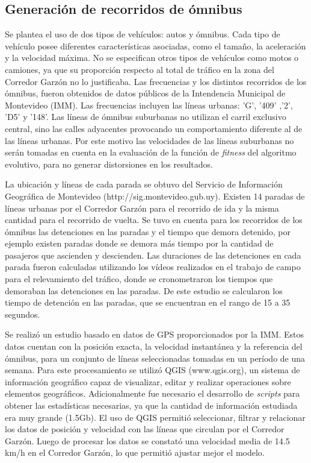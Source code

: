 \subsection{Generación de recorridos de ómnibus}

Se plantea el uso de dos tipos de vehículos: autos y ómnibus. Cada tipo de vehículo posee diferentes características asociadas, como el tamaño, la aceleración y la velocidad máxima. No se especifican otros tipos de vehículos como motos o camiones, ya que su proporción respecto al total de tráfico en la zona del Corredor Garzón no lo justificaba. Las frecuencias y los distintos recorridos de los ómnibus, fueron obtenidos de datos públicos de la Intendencia Municipal de Montevideo (IMM). Las frecuencias incluyen las líneas urbanas: 'G', '409' ,'2', 'D5'  y  '148'. Las líneas de ómnibus suburbanas no utilizan el carril exclusivo central, sino las calles adyacentes provocando un comportamiento diferente al de las líneas urbanas. Por este motivo las velocidades de las líneas suburbanas no serán tomadas en cuenta en la evaluación de la función de \emph{fitness} del algoritmo evolutivo, para no generar distorsiones en los resultados.

La ubicación y líneas de cada parada se obtuvo del Servicio de Información Geográfica de Montevideo (http://sig.montevideo.gub.uy). Existen 14 paradas de líneas urbanas por el Corredor Garzón para el recorrido de ida y la misma cantidad para el recorrido de vuelta. Se tuvo en cuenta para los recorridos de los ómnibus las detenciones en las paradas y el tiempo que demora detenido, por ejemplo existen paradas donde se demora más tiempo por la cantidad de pasajeros que ascienden y descienden. Las duraciones de las detenciones en cada parada fueron calculadas utilizando los vídeos realizados en el trabajo de campo para el relevamiento del tráfico, donde se cronometraron los tiempos que demoraban las detenciones en las paradas. De este estudio se calcularon los tiempo de detención en las paradas, que se encuentran en el rango de 15 a 35 segundos.

Se realizó un estudio basado en datos de GPS proporcionados por la IMM. Estos datos cuentan con la posición exacta, la velocidad instantánea y la referencia del ómnibus, para un conjunto de líneas seleccionadas tomadas en un período de una semana. 
Para este procesamiento se utilizó QGIS (www.qgis.org), un sistema de información geográfico capaz de visualizar, editar y realizar operaciones sobre elementos geográficos. Adicionalmente fue necesario el desarrollo de \emph{scripts} para obtener las estadísticas necesarias, ya que la cantidad de información estudiada era muy grande (1.5Gb). El uso de QGIS permitió seleccionar, filtrar y relacionar los datos de posición y velocidad con las líneas que circulan por el Corredor Garzón. Luego de procesar los datos se constató una velocidad media de 14.5 km/h en el Corredor Garzón, lo que permitió ajustar mejor el modelo. 


